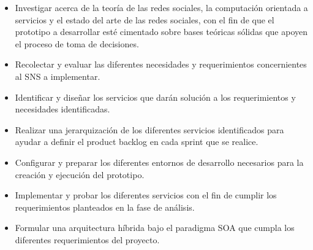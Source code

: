 \begin{itemize}
  
  \item Investigar acerca de la teoría de las redes sociales, la computación orientada a servicios y el estado del arte de las redes sociales, con el fin de que el prototipo a desarrollar esté cimentado sobre bases teóricas sólidas que apoyen el proceso de toma de decisiones.

  \item Recolectar y evaluar las diferentes necesidades y requerimientos concernientes al SNS a implementar.
  
  \item Identificar y diseñar los servicios que darán solución a los requerimientos y necesidades identificadas.

  \item Realizar una jerarquización de los diferentes servicios identificados para ayudar a definir el product backlog en cada sprint que se realice.
  
  \item Configurar y preparar los diferentes entornos de desarrollo necesarios para la creación y ejecución del prototipo.
  
  \item Implementar y probar los diferentes servicios con el fin de cumplir los requerimientos planteados en la fase de análisis.

  \item Formular una arquitectura híbrida bajo el paradigma SOA que cumpla los diferentes requerimientos del proyecto.
\end{itemize}
